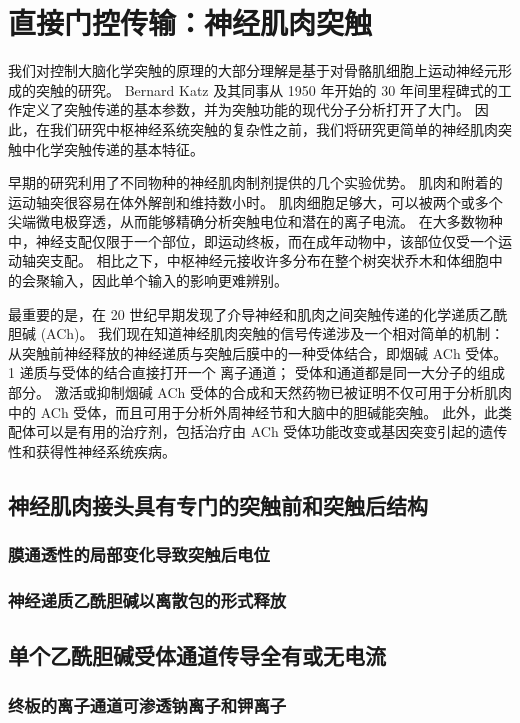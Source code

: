 \chapter{直接门控传输：神经肌肉突触}

我们对控制大脑化学突触的原理的大部分理解是基于对骨骼肌细胞上运动神经元形成的突触的研究。 Bernard Katz 及其同事从 1950 年开始的 30 年间里程碑式的工作定义了突触传递的基本参数，并为突触功能的现代分子分析打开了大门。 因此，在我们研究中枢神经系统突触的复杂性之前，我们将研究更简单的神经肌肉突触中化学突触传递的基本特征。

早期的研究利用了不同物种的神经肌肉制剂提供的几个实验优势。 肌肉和附着的运动轴突很容易在体外解剖和维持数小时。 肌肉细胞足够大，可以被两个或多个尖端微电极穿透，从而能够精确分析突触电位和潜在的离子电流。 在大多数物种中，神经支配仅限于一个部位，即运动终板，而在成年动物中，该部位仅受一个运动轴突支配。 相比之下，中枢神经元接收许多分布在整个树突状乔木和体细胞中的会聚输入，因此单个输入的影响更难辨别。

最重要的是，在 20 世纪早期发现了介导神经和肌肉之间突触传递的化学递质乙酰胆碱 (ACh)。 我们现在知道神经肌肉突触的信号传递涉及一个相对简单的机制：从突触前神经释放的神经递质与突触后膜中的一种受体结合，即烟碱 ACh 受体。1 递质与受体的结合直接打开一个 离子通道； 受体和通道都是同一大分子的组成部分。 激活或抑制烟碱 ACh 受体的合成和天然药物已被证明不仅可用于分析肌肉中的 ACh 受体，而且可用于分析外周神经节和大脑中的胆碱能突触。 此外，此类配体可以是有用的治疗剂，包括治疗由 ACh 受体功能改变或基因突变引起的遗传性和获得性神经系统疾病。

\section{神经肌肉接头具有专门的突触前和突触后结构}


\subsection{膜通透性的局部变化导致突触后电位}

\subsection{神经递质乙酰胆碱以离散包的形式释放}


\section{单个乙酰胆碱受体通道传导全有或无电流}
\subsection{终板的离子通道可渗透钠离子和钾离子}
